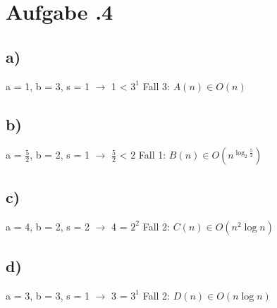 \newpage
\section*{Aufgabe \bn.4}
\subsection*{a)}
a = 1, b = 3, s = 1 $\rightarrow$ 1 < $3^1$ Fall 3: $A(n)\in O(n)$
\subsection*{b)}
a = $\frac{ 5 }{ 2 } $, b = 2, s = 1 $\rightarrow$ $\frac{ 5 }{ 2 } $ < 2 Fall 1: $B(n)\in O(n^{\log_{2}\frac{ 5 }{ 2 } })$
\subsection*{c)}
a = 4, b = 2, s = 2 $\rightarrow$ 4 = $2^2$ Fall 2: $C(n)\in O(n^2\log n)$
\subsection*{d)}
a = 3, b = 3, s = 1 $\rightarrow$ 3 = $3^1$ Fall 2: $D(n)\in O(n\log n)$